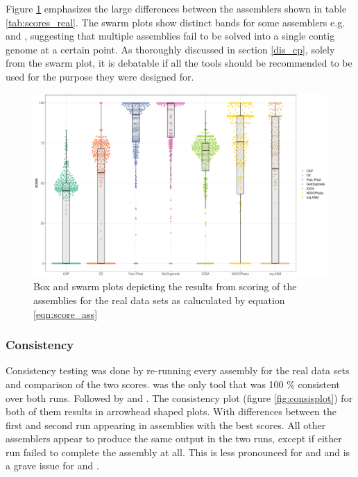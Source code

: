 Figure \ref{fig:swarm} emphasizes the large differences between the assemblers shown in
table \ref{tab:scores_real}. The swarm plots show distinct bands for some assemblers
e.g. \np \hspace{0.5ex} and \oa, suggesting that multiple assemblies fail to be solved
into a single contig genome at a certain point. As thoroughly discussed in section
\ref{dis_cp}, solely from the swarm plot, it is debatable if all the tools should be
recommended to be used for the purpose they were designed for.

\begin{figure}[H]
\centering
\includegraphics[height=.5\textheight, width=1\textwidth]{Figures/swarm}
\decoRule
\caption[Scores of assemblies from real data sets]{Box and swarm plots depicting the
  results from scoring of the assemblies for the real data sets as caluculated by equation
  \ref{eqn:score_ass}}
\label{fig:swarm}
\end{figure}

\subsubsection{Consistency}

Consistency testing was done by re-running every assembly for the real data sets and
comparison of the two scores. \ce \hspace{0.5ex} was the only tool that was 100 \%
consistent over both runs. Followed by \fp and \np. The consistency plot (figure
\ref{fig:consisplot}) for both of them results in arrowhead shaped plots. With differences
between the first and second run appearing in assemblies with the best scores. All other
assemblers appear to produce the same output in the two runs, except if either run failed
to complete the assembly at all. This is less pronounced for \cassp \hspace{0.5ex} and
\go\hspace{0.5ex} and is a grave issue for \oa \hspace{0.5ex} and \ioga.


